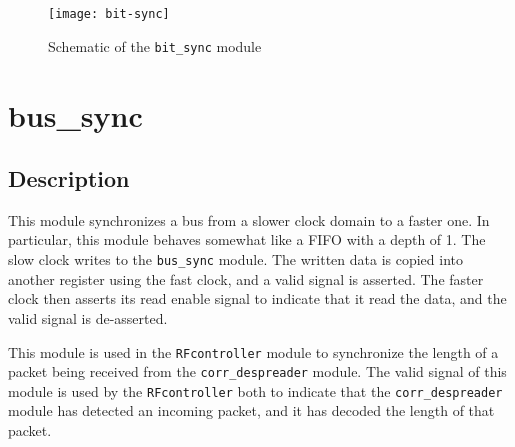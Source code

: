 \begin{figure}
\centering
\texttt{[image: bit-sync]}
\caption{Schematic of the \texttt{bit\_sync} module}
\label{fig:bit-sync}
\end{figure}

\section{bus\_sync}
\subsection{Description}
This module synchronizes a bus from a slower clock domain to a faster one. In particular, this module behaves somewhat like a FIFO with a depth of 1. The slow clock writes to the \texttt{bus\_sync} module. The written data is copied into another register using the fast clock, and a valid signal is asserted. The faster clock then asserts its read enable signal to indicate that it read the data, and the valid signal is de-asserted.

This module is used in the \texttt{RFcontroller} module to synchronize the length of a packet being received from the \texttt{corr\_despreader} module. The valid signal of this module is used by the \texttt{RFcontroller} both to indicate that the \texttt{corr\_despreader} module has detected an incoming packet, and it has decoded the length of that packet.

